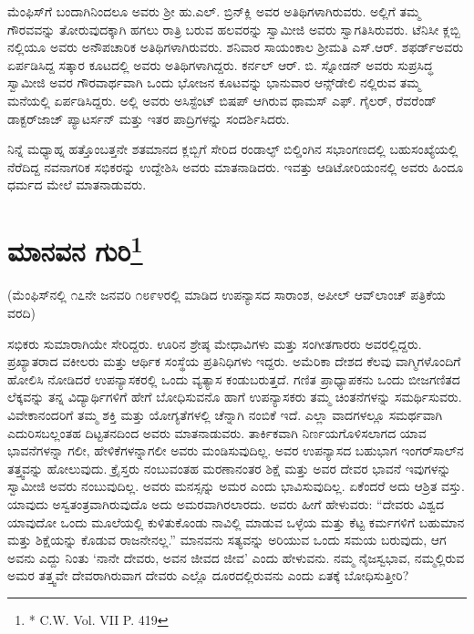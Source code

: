 ಮೆಂಫಿಸ್​ಗೆ ಬಂದಾಗಿನಿಂದಲೂ ಅವರು ಶ‍್ರೀ ಹು.ಎಲ್​. ಬ್ರಿನ್​ಕ್ಲಿ ಅವರ ಅತಿಥಿಗಳಾಗಿರುವರು. ಅಲ್ಲಿಗೆ ತಮ್ಮ ಗೌರವವನ್ನು ತೋರುವುದಕ್ಕಾಗಿ ಹಗಲು ರಾತ್ರಿ ಬರುವ ಹಲವರನ್ನು ಸ್ವಾಮೀಜಿ ಅವರು ಸ್ವಾಗತಿಸಿರುವರು. ಟೆನಿಸೀ ಕ್ಲಬ್ಬಿ ನಲ್ಲಿಯೂ ಅವರು ಅನೌಪಚಾರಿಕ ಅತಿಥಿಗಳಾಗಿರುವರು. ಶನಿವಾರ ಸಾಯಂಕಾಲ ಶ‍್ರೀಮತಿ ಎಸ್​.ಆರ್​. ಶಫರ್ಡ್​ ಅವರು ಏರ್ಪಡಿಸಿದ್ದ ಸತ್ಕಾರ ಕೂಟದಲ್ಲಿ ಅವರು ಅತಿಥಿಗಳಾಗಿದ್ದರು. ಕರ್ನಲ್​ ಆರ್​. ಬಿ. ಸ್ನೋಡನ್​ ಅವರು ಸುಪ್ರಸಿದ್ಧ ಸ್ವಾಮೀಜಿ ಅವರ ಗೌರವಾರ್ಥವಾಗಿ ಒಂದು ಭೋಜನ ಕೂಟವನ್ನು ಭಾನುವಾರ ಆನ್ಸ್​ಡೇಲಿ ನಲ್ಲಿರುವ ತಮ್ಮ ಮನೆಯಲ್ಲಿ ಏರ್ಪಡಿಸಿದ್ದರು. ಅಲ್ಲಿ ಅವರು ಅಸಿಸ್ಟೆಂಟ್​ ಬಿಷಪ್​ ಆಗಿರುವ ಥಾಮಸ್​ ಎಫ್​. ಗೈಲರ್​, ರೆವರೆಂಡ್​ ಡಾಕ್ಟರ್​ ಜಾಜ್​ ಪ್ಯಾಟರ್ಸನ್​ ಮತ್ತು ಇತರ ಪಾದ್ರಿಗಳನ್ನು ಸಂದರ್ಶಿಸಿದರು.

ನಿನ್ನೆ ಮಧ್ಯಾಹ್ನ ಹತ್ತೊಂಬತ್ತನೇ ಶತಮಾನದ ಕ್ಲಬ್ಬಿಗೆ ಸೇರಿದ ರಂಡಾಲ್ಫ್​ ಬಿಲ್ಡಿಂಗಿನ ಸಭಾಂಗಣದಲ್ಲಿ ಬಹುಸಂಖ್ಯೆಯಲ್ಲಿ ನೆರೆದಿದ್ದ ನವನಾಗರಿಕ ಸಭಿಕರನ್ನು ಉದ್ದೇಶಿಸಿ ಅವರು ಮಾತನಾಡಿದರು. ಇವತ್ತು ಆಡಿಟೋರಿಯಂನಲ್ಲಿ ಅವರು ಹಿಂದೂ ಧರ್ಮದ ಮೇಲೆ ಮಾತನಾಡುವರು.

\delimiter


\section{ಮಾನವನ ಗುರಿ\protect\footnote{* C.W. Vol. VII P. 419}}

\begin{center}
(ಮೆಂಫಿಸ್​ನಲ್ಲಿ ೧೭ನೇ ಜನವರಿ ೧೮೯೪ರಲ್ಲಿ ಮಾಡಿದ ಉಪನ್ಯಾಸದ ಸಾರಾಂಶ, ಅಪೀಲ್​ ಆವ್​ಲಾಂಚ್​ ಪತ್ರಿಕೆಯ ವರದಿ)
\end{center}

ಸಭಿಕರು ಸುಮಾರಾಗಿಯೇ ಸೇರಿದ್ದರು. ಊರಿನ ಶ್ರೇಷ್ಠ ಮೇಧಾವಿಗಳು ಮತ್ತು ಸಂಗೀತಗಾರರು ಅವರಲ್ಲಿದ್ದರು. ಪ್ರಖ್ಯಾತರಾದ ವಕೀಲರು ಮತ್ತು ಆರ್ಥಿಕ ಸಂಸ್ಥೆಯ ಪ್ರತಿನಿಧಿಗಳು ಇದ್ದರು. ಅಮೆರಿಕಾ ದೇಶದ ಕೆಲವು ವಾಗ್ಮಿಗಳೊಂದಿಗೆ ಹೋಲಿಸಿ ನೋಡಿದರೆ ಉಪನ್ಯಾಸಕರಲ್ಲಿ ಒಂದು ವ್ಯತ್ಯಾಸ ಕಂಡುಬರುತ್ತದೆ. ಗಣಿತ ಪ್ರಾಧ್ಯಾಪಕನು ಒಂದು ಬೀಜಗಣಿತದ ಲೆಕ್ಕವನ್ನು ತನ್ನ ವಿದ್ಯಾರ್ಥಿಗಳಿಗೆ ಹೇಗೆ ಬೋಧಿಸುವನೊ ಹಾಗೆ ಉಪನ್ಯಾಸಕರು ತಮ್ಮ ಚಿಂತನೆಗಳನ್ನು ಸಮರ್ಥಿಸುವರು. ವಿವೇಕಾನಂದರಿಗೆ ತಮ್ಮ ಶಕ್ತಿ ಮತ್ತು ಯೋಗ್ಯತೆಗಳಲ್ಲಿ ಚೆನ್ನಾಗಿ ನಂಬಿಕೆ ಇದೆ. ಎಲ್ಲಾ ವಾದಗಳಲ್ಲೂ ಸಮರ್ಥವಾಗಿ ಎದುರಿಸಬಲ್ಲಂತಹ ದಿಟ್ಟತನದಿಂದ ಅವರು ಮಾತನಾಡುವರು. ತಾರ್ಕಿಕವಾಗಿ ನಿರ್ಣಯಗೊಳಿಸಲಾಗದ ಯಾವ ಭಾವನೆಗಳನ್ನಾ ಗಲೀ, ಹೇಳಿಕೆಗಳನ್ನಾಗಲೀ ಅವರು ಮಂಡಿಸುವುದಿಲ್ಲ. ಅವರ ಉಪನ್ಯಾಸದ ಬಹುಭಾಗ ಇಂಗರ್​ಸಾಲ್​ನ ತತ್ತ್ವವನ್ನು ಹೋಲುವುದು. ಕ್ರೈಸ್ತರು ನಂಬುವಂತಹ ಮರಣಾನಂತರ ಶಿಕ್ಷೆ ಮತ್ತು ಅವರ ದೇವರ ಭಾವನೆ ಇವುಗಳನ್ನು ಸ್ವಾಮೀಜಿ ಅವರು ನಂಬುವುದಿಲ್ಲ. ಅವರು ಮನಸ್ಸನ್ನು ಅಮರ ಎಂದು ಭಾವಿಸುವುದಿಲ್ಲ. ಏಕೆಂದರೆ ಅದು ಆಶ್ರಿತ ವಸ್ತು. ಯಾವುದು ಅಸ್ವತಂತ್ರವಾಗಿರುವುದೊ ಅದು ಅಮರವಾಗಿರಲಾರದು. ಅವರು ಹೀಗೆ ಹೇಳುವರು: “ದೇವರು ವಿಶ್ವದ ಯಾವುದೋ ಒಂದು ಮೂಲೆಯಲ್ಲಿ ಕುಳಿತುಕೊಂಡು ನಾವಿಲ್ಲಿ ಮಾಡುವ ಒಳ್ಳೆಯ ಮತ್ತು ಕೆಟ್ಟ ಕರ್ಮಗಳಿಗೆ ಬಹುಮಾನ ಮತ್ತು ಶಿಕ್ಷೆಯನ್ನು ಕೊಡುವ ರಾಜನೇನಲ್ಲ.” ಮಾನವನು ಸತ್ಯವನ್ನು ಅರಿಯುವ ಒಂದು ಸಮಯ ಬರುವುದು, ಆಗ ಅವನು ಎದ್ದು ನಿಂತು ‘ನಾನೇ ದೇವರು, ಅವನ ಜೀವದ ಜೀವ’ ಎಂದು ಹೇಳುವನು. ನಮ್ಮ ನೈಜಸ್ವಭಾವ, ನಮ್ಮಲ್ಲಿರುವ ಅಮರ ತತ್ತ್ವವೇ ದೇವರಾಗಿರುವಾಗ ದೇವರು ಎಲ್ಲೊ ದೂರದಲ್ಲಿರುವನು ಎಂದು ಏತಕ್ಕೆ ಬೋಧಿಸುತ್ತೀರಿ?

